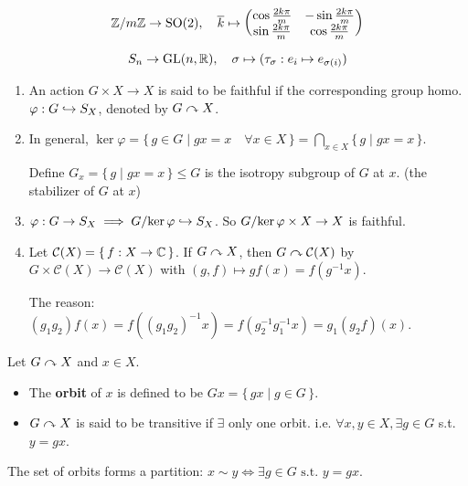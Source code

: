 \begin{example}
  \[
    {\mathbb{Z}}/{m\mathbb{Z}} \to \text{SO}(2), \quad
    \overline{k} \mapsto \begin{pmatrix}
      \cos \frac{2k\pi}{m} & -\sin \frac{2k\pi}{m} \\
      \sin \frac{2k\pi}{m} & \cos \frac{2k\pi}{m}
    \end{pmatrix}
  \]
\end{example}

\begin{example}
  \[
    S_n \to \text{GL}(n, \mathbb{R}), \quad
    \sigma \mapsto (\tau_\sigma: e_i \mapsto e_{\sigma(i)})
  \]
\end{example}

\begin{remark} \mbox{}
  \begin{enumerate}
    \item An action $G \times X \to X$ is said to be faithful if the
      corresponding group homo. $\varphi: G \hookrightarrow S_X$, denoted by
      $G \curvearrowright X$.
    \item In general, $\ker \varphi = \{\, g \in G \mid gx = x \quad
      \forall x \in X \,\} = \bigcap_{x \in X} \{\, g \mid gx = x \,\}$.

      Define $G_x = \{\, g \mid gx = x \,\} \le G$ is the isotropy subgroup
      of $G$ at $x$. (the stabilizer of $G$ at $x$)
    \item $\varphi: G \to S_X \implies {G}/{\operatorname{ker} \varphi} \hookrightarrow S_X$.
      So ${G}/{\operatorname{ker} \varphi} \times X \to X$ is faithful.
    \item Let $\mathcal{C}(X) = \{\, f: X \to \mathbb{C} \,\}$. If $G \curvearrowright X$, then
      $G \curvearrowright \mathcal{C}(X)$ by
      $G \times \mathcal{C}(X) \to \mathcal{C}(X)$ with
      $(g, f) \mapsto g f(x) = f(g^{-1}x)$.

      The reason: $(g_1g_2)f(x) = f((g_1g_2)^{-1}x) = f(g_2^{-1}g_1^{-1}x)
      = g_1(g_2 f)(x)$.
  \end{enumerate}
\end{remark}

\begin{definition}
  Let $G \curvearrowright X$ and $x \in X$.
  \begin{itemize}
    \item The {\bf orbit} of $x$ is defined to be
      $Gx = \{\, gx \mid g \in G \,\}$.
    \item $G \curvearrowright X$ is said to be transitive if $\exists$ only one orbit.
      i.e. $\forall x, y \in X, \exists g \in G$ s.t. $y = gx$.
  \end{itemize}
  The set of orbits forms a partition: $x \sim y \iff \exists g \in G
  \text{~s.t.~} y = gx$.
\end{definition}

